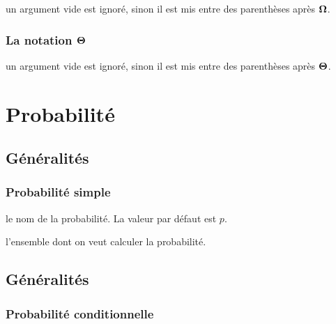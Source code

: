\documentclass[12pt,a4paper]{book}
\theoremstyle{definition}
\begin{document}
{{

\IDarg{} un argument vide est ignoré, sinon il est mis entre des parenthèses après $\bigomega{}$.




\subsubsection{\texorpdfstring{La notation $\bigtheta{}$}%
                           {La notation "grand Theta"}}




\IDarg{} un argument vide est ignoré, sinon il est mis entre des parenthèses après $\bigtheta{}$.





\section{Probabilité}

\subsection{Généralités}

\subsubsection{Probabilité \og simple \fg}




\IDoption{} le nom de la probabilité. La valeur par défaut est $p$.

\IDarg{} l'ensemble dont on veut calculer la probabilité.




\subsection{Généralités}

\subsubsection{Probabilité conditionnelle}





}}
\end{document}
